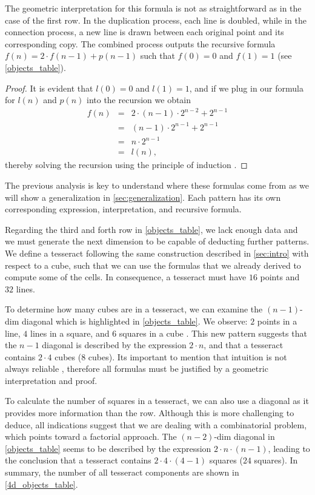 \documentclass{article}
\begin{document}
	The geometric interpretation for this formula is not as straightforward as in the case of the first row. In the duplication process, each line is doubled, while in the connection process, a new line is drawn between each original point and its corresponding copy. The combined process outputs the recursive formula $f(n) = 2 \cdot f(n-1) + p(n-1)$ such that $f(0) = 0$ and $f(1) = 1$ (see \autoref{objects_table}).
	
	\begin{proof}
		 It is evident that $l(0) = 0$ and $l(1) = 1$, and if we plug in our formula for $l(n)$ and $p(n)$ into the recursion we obtain
		\begin{eqnarray*}
			f(n) & = & 2 \cdot (n-1) \cdot 2^{n-2} + 2^{n-1}\\
			& = & (n-1) \cdot 2^{n-1} + 2^{n-1}\\
			& = & n \cdot 2^{n-1}\\
			& = & l(n),
		\end{eqnarray*}
		thereby solving the recursion using the principle of induction \cite{rosen2011discrete}.
	\end{proof}

	The previous analysis is key to understand where these formulas come from as we will show a generalization in \autoref{sec:generalization}. Each pattern has its own corresponding expression, interpretation, and recursive formula.
	
	Regarding the third and forth row in \autoref{objects_table}, we lack enough data and we must generate the next dimension to be capable of deducting further patterns. We define a tesseract following the same construction described in \autoref{sec:intro} with respect to a cube, such that we can use the formulas that we already derived to compute some of the cells. In consequence, a tesseract must have $16$ points and $32$ lines.
	
	To determine how many cubes are in a tesseract, we can examine the $(n-1)$-dim diagonal which is highlighted in \autoref{objects_table}. We observe: $2$ points in a line, $4$ lines in a square, and $6$ squares in a cube \cite{coxeter1973regular}. This new pattern suggests that the $n-1$ diagonal is described by the expression $2 \cdot n$, and that a tesseract contains $2 \cdot 4$ cubes ($8$ cubes). Its important to mention that intuition is not always reliable \cite{coxeter1973regular}, therefore all formulas must be justified by a geometric interpretation and proof.
	
	To calculate the number of squares in a tesseract, we can also use a diagonal as it provides more information than the row. Although this is more challenging to deduce, all indications suggest that we are dealing with a combinatorial problem, which points toward a factorial approach. The $(n-2)$-dim diagonal in \autoref{objects_table} seems to be described by the expression $2 \cdot n \cdot (n-1)$, leading to the conclusion that a tesseract contains $2 \cdot 4 \cdot (4-1)$ squares ($24$ squares). In summary, the number of all tesseract components are shown in \autoref{4d_objects_table}.
	
\end{document}
